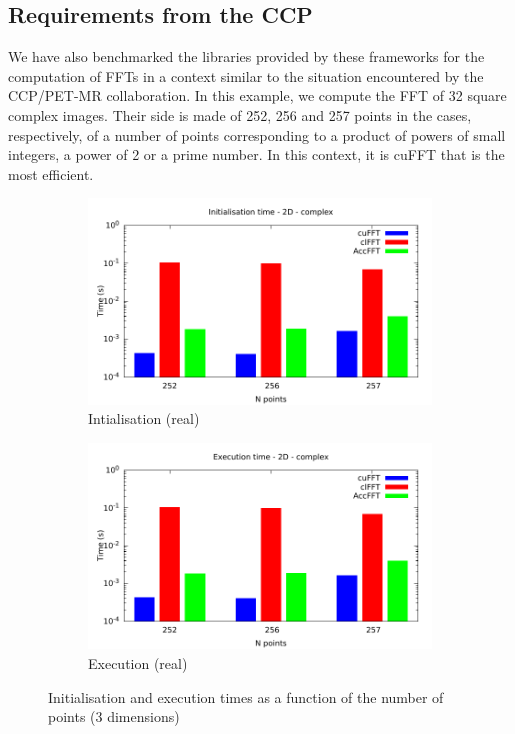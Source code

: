 \documentclass[12pt, a4paper]{article}
\begin{document}
\subsection{Requirements from the CCP}\label{CCPPETMR}
We have also benchmarked the libraries provided by these frameworks
for the computation of FFTs in a context similar to the situation
encountered by the CCP/PET-MR collaboration. In this example, we
compute the FFT of 32 square complex images. Their side is made of
252, 256 and 257 points in the cases, respectively, of a number of
points corresponding to a product of powers of small integers, a power
of 2 or a prime number. In this context, it is cuFFT that is the most
efficient.
\begin{figure}[H]
\captionsetup{width=0.8\linewidth}
\centering
\begin{subfigure}{.5\textwidth}
\centering
\includegraphics[width=.9\linewidth]{graphs/fft-ccppetmr-init.pdf}
\caption{Intialisation (real)}
\label{CCPPETMRDRI}
\end{subfigure}%
\begin{subfigure}{.5\textwidth}
\centering
\includegraphics[width=.9\linewidth]{graphs/fft-ccppetmr-exec.pdf}
\caption{Execution (real)}
\label{CCPPETMRRE}
\end{subfigure}
\caption{Initialisation and execution times as a function of the number of points (3 dimensions)}
\label{CCPPETMRGRAPH}
\end{figure}
\end{document}
